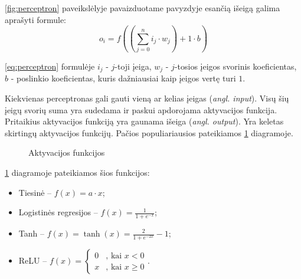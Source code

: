 \documentclass{VUMIFPSbakalaurinis}
\begin{document}
\ref{fig:perceptron} paveikslėlyje pavaizduotame pavyzdyje esančią išeigą galima aprašyti formule:
\begin{equation}
	o_i = f((\sum_{j=0}^{n}i_j \cdot w_j) + 1 \cdot b)
	\label{eq:perceptron}
\end{equation}

\ref{eq:perceptron} formulėje $i_j$ - $j$-toji įeiga, $w_j$ - $j$-tosios įeigos svorinis koeficientas, $b$ - poslinkio koeficientas, kuris dažniausiai kaip įeigos vertę turi $1$.

Kiekvienas perceptronas gali gauti vieną ar kelias įeigas (\textit{angl. input}). Visų šių įeigų svorių suma yra sudedama ir paskui apdorojama aktyvacijos funkcija. Pritaikius aktyvacijos funkciją yra gaunama išeiga (\textit{angl. output}). Yra keletas skirtingų aktyvacijos funkcijų. Pačios populiariausios pateikiamos \ref{fig:aktyvacijosfunkc} diagramoje.
\begin{figure}[H]
	\centering
	
	
	\caption{Aktyvacijos funkcijos} \label{fig:aktyvacijosfunkc}
\end{figure}


\ref{fig:aktyvacijosfunkc} diagramoje pateikiamos šios funkcijos:

\begin{itemize}
	\item Tiesinė – $f(x) = a \cdot x$;
	\item Logistinės regresijos – $f(x) = \frac{1}{1+e^{-x}}$;
	\item Tanh – $f(x) = \tanh(x) = \frac{2}{1+e^{-2x}} - 1$;
	\item ReLU – $f(x) = \begin{cases}
	0 & \text{, kai } x < 0 \\
	x & \text{, kai } x \ge 0
	\end{cases} $.
\end{itemize}
\end{document}
